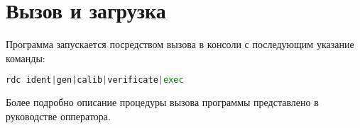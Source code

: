 \newpage
\section{Вызов и загрузка}

Программа запускается посредством вызова в консоли с последующим указание команды:
\begin{lstlisting}[language=python, numbers=none, frame=single]
rdc ident|gen|calib|verificate|exec
\end{lstlisting}
Более подробно описание процедуры вызова программы представлено в руководстве опператора.